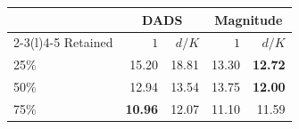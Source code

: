 \begin{tabular}{@{}lrrrr@{}}
\toprule
& \multicolumn{2}{c}{DADS} & \multicolumn{2}{c}{Magnitude}\\
\cmidrule(lr){2-3}\cmidrule(l){4-5}
Retained & $1$ & $d/K$ & $1$ & $d/K$\\
\midrule
25\% & 15.20 & 18.81 & 13.30 & \textbf{12.72}\\
50\% & 12.94 & 13.54 & 13.75 & \textbf{12.00}\\
75\% & \textbf{10.96} & 12.07 & 11.10 & 11.59\\
\bottomrule
\end{tabular}
